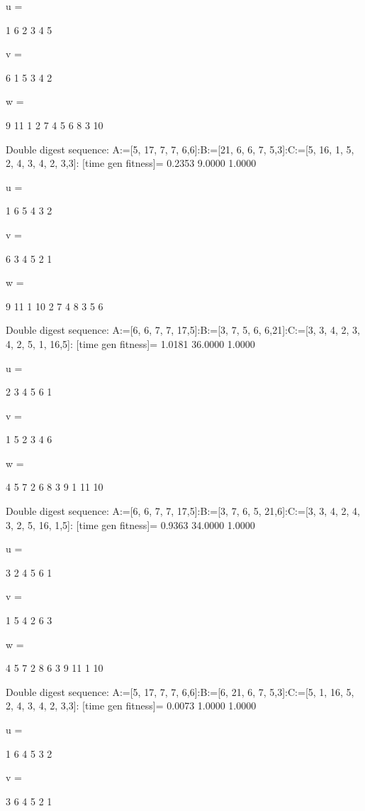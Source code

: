u =

     1     6     2     3     4     5


v =

     6     1     5     3     4     2


w =

     9    11     1     2     7     4     5     6     8     3    10

Double digest sequence:
A:=[5, 17, 7, 7, 6,6]:B:=[21, 6, 6, 7, 5,3]:C:=[5, 16, 1, 5, 2, 4, 3, 4, 2, 3,3]:
[time gen fitness]=
    0.2353    9.0000    1.0000


u =

     1     6     5     4     3     2


v =

     6     3     4     5     2     1


w =

     9    11     1    10     2     7     4     8     3     5     6

Double digest sequence:
A:=[6, 6, 7, 7, 17,5]:B:=[3, 7, 5, 6, 6,21]:C:=[3, 3, 4, 2, 3, 4, 2, 5, 1, 16,5]:
[time gen fitness]=
    1.0181   36.0000    1.0000


u =

     2     3     4     5     6     1


v =

     1     5     2     3     4     6


w =

     4     5     7     2     6     8     3     9     1    11    10

Double digest sequence:
A:=[6, 6, 7, 7, 17,5]:B:=[3, 7, 6, 5, 21,6]:C:=[3, 3, 4, 2, 4, 3, 2, 5, 16, 1,5]:
[time gen fitness]=
    0.9363   34.0000    1.0000


u =

     3     2     4     5     6     1


v =

     1     5     4     2     6     3


w =

     4     5     7     2     8     6     3     9    11     1    10

Double digest sequence:
A:=[5, 17, 7, 7, 6,6]:B:=[6, 21, 6, 7, 5,3]:C:=[5, 1, 16, 5, 2, 4, 3, 4, 2, 3,3]:
[time gen fitness]=
    0.0073    1.0000    1.0000


u =

     1     6     4     5     3     2


v =

     3     6     4     5     2     1



